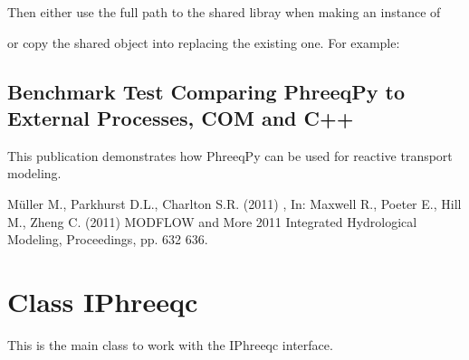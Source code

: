 \documentclass[letterpaper,10pt,english]{sphinxmanual}
\begin{document}
Then either use the full path to the shared libray when making an instance of

\begin{sphinxVerbatim}[commandchars=\\\{\}]
  
\end{sphinxVerbatim}

or copy the shared object into  replacing the existing
one. For example:

\begin{sphinxVerbatim}[commandchars=\\\{\}]
    
\end{sphinxVerbatim}


\section{Benchmark Test Comparing PhreeqPy to External Processes, COM and C++}
\label{\detokenize{index:benchmark-test-comparing-phreeqpy-to-external-processes-com-and-c}}
This publication demonstrates how PhreeqPy can be used for reactive transport
modeling.

Müller M., Parkhurst D.L., Charlton S.R. (2011)
 ,
In: Maxwell R., Poeter E., Hill M., Zheng C. (2011) MODFLOW and More 2011 \sphinxhyphen{}
Integrated Hydrological Modeling, Proceedings, pp. 632 \sphinxhyphen{} 636.


\chapter{Class IPhreeqc}
\label{\detokenize{iphreeqc:class-iphreeqc}}\label{\detokenize{iphreeqc::doc}}
This is the main class to work with the IPhreeqc interface.
\end{document}
